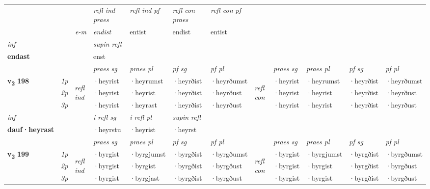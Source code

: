 \begin{longtable}[l]{X>{\footnotesize\itshape}llXXXXlXXXX}
 & && \textit{refl ind praes} & \textit{refl ind pf} & \textit{refl con praes} & \textit{refl con pf} \\*
\multicolumn{3}{r}{\textit{e-m}}& endist & entist & endist & entist \\*

\cmidrule{4-7}
   {\textit{inf}} & &       & \textit{supin refl}  \\*
  {\textbf{endast}} & &       & enst  \\*

\midrule

 & &   & \textit{praes sg}  & \textit{praes pl}    & \textit{ pf sg} & \textit{pf pl} & & \textit{praes sg}  & \textit{praes pl}    & \textit{pf sg} & \textit{pf pl }  \\ \cmidrule{4-7} \cmidrule{9-12}
 \multirow{2}{*}{{{\textbf{v{\textsubscript{2}}} \Large{\textbf{198}}}}}  & 1p & \multirow{3}{*}{\begin{turn}{90}\textit{refl ind}\end{turn}}  & ·heyrist & ·heyrumst & ·heyrðist & ·heyrðumst & \multirow{3}{*}{\begin{turn}{90}\textit{refl con}\end{turn}}  &·heyrist & ·heyrumst & ·heyrðist & ·heyrðumst \\*
 & 2p &  & ·heyrist & ·heyrist & ·heyrðist & ·heyrðust & &·heyrist & ·heyrist & ·heyrðist & ·heyrðust \\*
 & 3p  & & ·heyrist & ·heyrast & ·heyrðist & ·heyrðust & & ·heyrist & ·heyrist& ·heyrðist & ·heyrðust \\*
\cmidrule{4-7} \cmidrule{9-12}

   {\textit{inf}} & &   & \textit{i refl sg} & \textit{i refl pl}   & \textit{supin refl}  \\*
  {\textbf{dauf\allowbreak ·heyrast}} & &   & ·heyrstu & ·heyrist   & ·heyrst  \\*

\midrule

 & &   & \textit{praes sg}  & \textit{praes pl}    & \textit{ pf sg} & \textit{pf pl} & & \textit{praes sg}  & \textit{praes pl}    & \textit{pf sg} & \textit{pf pl }  \\ \cmidrule{4-7} \cmidrule{9-12}
 \multirow{2}{*}{{{\textbf{v{\textsubscript{2}}} \Large{\textbf{199}}}}}  & 1p & \multirow{3}{*}{\begin{turn}{90}\textit{refl ind}\end{turn}}  & ·byrgist & ·byrgjumst & ·byrgðist & ·byrgðumst & \multirow{3}{*}{\begin{turn}{90}\textit{refl con}\end{turn}}  &·byrgist & ·byrgjumst & ·byrgðist & ·byrgðumst \\*
 & 2p &  & ·byrgist & ·byrgist & ·byrgðist & ·byrgðust & &·byrgist & ·byrgist & ·byrgðist & ·byrgðust \\*
 & 3p  & & ·byrgist & ·byrgjast & ·byrgðist & ·byrgðust & & ·byrgist & ·byrgist& ·byrgðist & ·byrgðust \\*
\cmidrule{4-7} \cmidrule{9-12}


\end{longtable}
